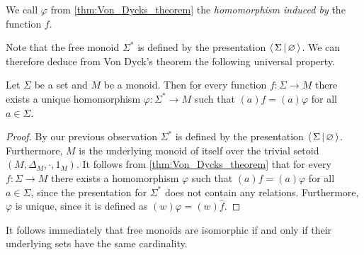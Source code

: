We call $\varphi$ from \cref{thm:Von_Dycks_theorem} the \emph{homomorphism induced by} the function $f$.

Note that the free monoid $\Sigma^\ast$ is defined by the presentation $\left\langle\, \Sigma \,\middle|\, \varnothing \,\right\rangle$.
We can therefore deduce from Von Dyck's theorem the following universal property.

\begin{lemma}%
  \label{lem:universal_property_free_monoid}
  \rocqok{}
  Let $\Sigma$ be a set and $M$ be a monoid. Then for every function $f: \Sigma\rightarrow M$ there
  exists a unique homomorphism $\varphi: \Sigma^\ast \rightarrow M$ such that $(a)f = (a)\varphi$ for all $a\in \Sigma$.
\end{lemma}
\begin{proof}
  \rocqok{}
  By our previous observation $\Sigma^\ast$ is defined by the presentation
  $\left\langle\, \Sigma \,\middle|\, \varnothing \,\right\rangle$. Furthermore, $M$ is the underlying monoid of itself over the
  trivial setoid $(M, \Delta_M, \cdot , 1_M)$.
  It follows from \cref{thm:Von_Dycks_theorem} that for every
  $f: \Sigma\rightarrow M$ there exists a homomorphism $\varphi$ such that $(a)f = (a)\varphi$ for
  all $a\in \Sigma$, since the presentation for $\Sigma^\ast$ does not contain any relations.
  Furthermore, $\varphi$ is unique, since it is defined as $(w)\varphi = (w)\widehat{f}$.
\end{proof}

It follows immediately that free monoids are isomorphic if and only if their underlying sets have the same cardinality.

